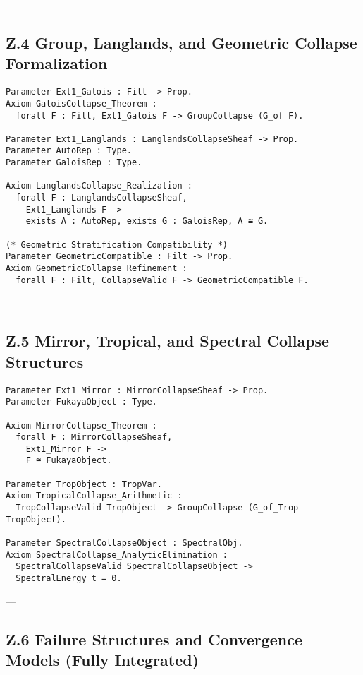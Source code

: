 \documentclass[11pt]{article}
\begin{document}
---

\subsection*{Z.4 Group, Langlands, and Geometric Collapse Formalization}

\begin{lstlisting}[language=Coq]
Parameter Ext1_Galois : Filt -> Prop.
Axiom GaloisCollapse_Theorem :
  forall F : Filt, Ext1_Galois F -> GroupCollapse (G_of F).

Parameter Ext1_Langlands : LanglandsCollapseSheaf -> Prop.
Parameter AutoRep : Type.
Parameter GaloisRep : Type.

Axiom LanglandsCollapse_Realization :
  forall F : LanglandsCollapseSheaf,
    Ext1_Langlands F ->
    exists A : AutoRep, exists G : GaloisRep, A ≅ G.

(* Geometric Stratification Compatibility *)
Parameter GeometricCompatible : Filt -> Prop.
Axiom GeometricCollapse_Refinement :
  forall F : Filt, CollapseValid F -> GeometricCompatible F.
\end{lstlisting}

---

\subsection*{Z.5 Mirror, Tropical, and Spectral Collapse Structures}

\begin{lstlisting}[language=Coq]
Parameter Ext1_Mirror : MirrorCollapseSheaf -> Prop.
Parameter FukayaObject : Type.

Axiom MirrorCollapse_Theorem :
  forall F : MirrorCollapseSheaf,
    Ext1_Mirror F ->
    F ≅ FukayaObject.

Parameter TropObject : TropVar.
Axiom TropicalCollapse_Arithmetic :
  TropCollapseValid TropObject -> GroupCollapse (G_of_Trop TropObject).

Parameter SpectralCollapseObject : SpectralObj.
Axiom SpectralCollapse_AnalyticElimination :
  SpectralCollapseValid SpectralCollapseObject ->
  SpectralEnergy t = 0.
\end{lstlisting}

---

\subsection*{Z.6 Failure Structures and Convergence Models (Fully Integrated)}
\end{document}
